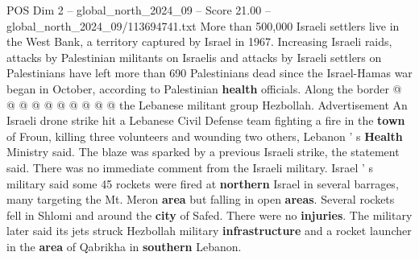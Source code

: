 \begin{textsample}{POS Dim 2 – global\_north\_2024\_09 – Score 21.00 – global\_north\_2024\_09/113694741.txt}
More than 500,000 Israeli settlers live in the West Bank, a territory captured by Israel in 1967.
Increasing Israeli raids, attacks by Palestinian militants on Israelis and attacks by Israeli settlers on Palestinians have left more than 690 Palestinians dead since the Israel-Hamas war began in October, according to Palestinian \textbf{health} officials.
Along the border @ @ @ @ @ @ @ @ @ @ the Lebanese militant group Hezbollah.
Advertisement An Israeli drone strike hit a Lebanese Civil Defense team fighting a fire in the \textbf{town} of Froun, killing three volunteers and wounding two others, Lebanon ' s \textbf{Health} Ministry said.
The blaze was sparked by a previous Israeli strike, the statement said.
There was no immediate comment from the Israeli military.
Israel ' s military said some 45 rockets were fired at \textbf{northern} Israel in several barrages, many targeting the Mt.
Meron \textbf{area} but falling in open \textbf{areas}.
Several rockets fell in Shlomi and around the \textbf{city} of Safed.
There were no \textbf{injuries}.
The military later said its jets struck Hezbollah military \textbf{infrastructure} and a rocket launcher in the \textbf{area} of Qabrikha in \textbf{southern} Lebanon.

\end{textsample}
